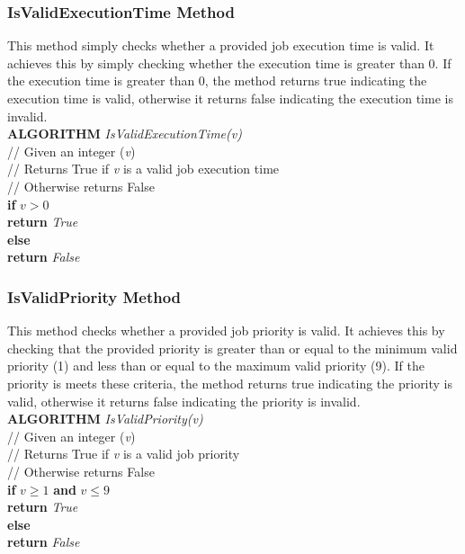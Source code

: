 \documentclass[12pt,a4paper]{article}
\begin{document}
			\subsubsection{IsValidExecutionTime Method}
				This method simply checks whether a provided job execution time is valid. It achieves 
				this by simply checking whether the execution time is greater than 0. If the execution 
				time is greater than 0, the method returns true indicating the execution time is valid,
				otherwise it returns false indicating the execution time is invalid.\\

				\textbf{ALGORITHM} \textit{IsValidExecutionTime(v)}\\
				\null\qquad\quad// Given an integer (\textit{v})\\
				\null\qquad\quad// Returns True if \textit{v} is a valid job execution time\\
				\null\qquad\quad// Otherwise returns False\\
				\null\qquad\quad\textbf{if} \textit{$v > 0$}\\
				\null\qquad\qquad\textbf{return} \textit{True}\\
				\null\qquad\quad\textbf{else}\\
				\null\qquad\qquad\textbf{return} \textit{False}

			\newpage

			\subsubsection{IsValidPriority Method}
				This method checks whether a provided job priority is valid. It achieves this by 
				checking that the provided priority is greater than or equal to the minimum valid priority (1) and 
				less than or equal to the maximum valid priority (9). If the priority is meets these criteria, the 
				method returns true indicating the priority is valid, otherwise it returns false 
				indicating the priority is invalid.\\

				\textbf{ALGORITHM} \textit{IsValidPriority(v)}\\
				\null\qquad\quad// Given an integer (\textit{v})\\
				\null\qquad\quad// Returns True if \textit{v} is a valid job priority\\
				\null\qquad\quad// Otherwise returns False\\
				\null\qquad\quad\textbf{if} \textit{$v \geq 1$} \textbf{and} \textit{$v \leq 9$}\\
				\null\qquad\qquad\textbf{return} \textit{True}\\
				\null\qquad\quad\textbf{else}\\
				\null\qquad\qquad\textbf{return} \textit{False}\\
			
\end{document}
